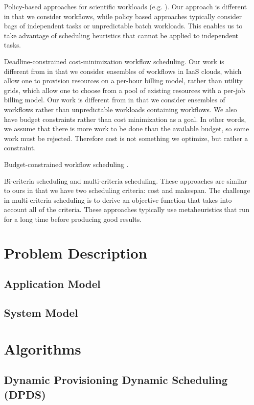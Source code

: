\documentclass{sig-alternate}
\begin{document}
Policy-based approaches for scientific workloads (e.g. \cite{Marshall2010, Kim2011}). Our approach is different in that we consider workflows, while policy based approaches typically consider bags of independent tasks or unpredictable batch workloads. This enables us to take advantage of scheduling heuristics that cannot be applied to independent tasks.

Deadline-constrained cost-minimization workflow scheduling. Our work is different from \cite{Yu2005, Abrishami2010} in that we consider ensembles of workflows in IaaS clouds, which allow one to provision resources on a per-hour billing model, rather than utility grids, which allow one to choose from a pool of existing resources with a per-job billing model. Our work is different from \cite{Mao2011} in that we consider ensembles of workflows rather than unpredictable workloads containing workflows. We also have budget constraints rather than cost minimization as a goal. In other words, we assume that there is more work to be done than the available budget, so some work must be rejected. Therefore cost is not something we optimize, but rather a constraint.

Budget-constrained workflow scheduling \cite{Sakellariou2007}.

Bi-criteria scheduling and multi-criteria scheduling. These approaches are similar to ours in that we have two scheduling criteria: cost and makespan. The challenge in multi-criteria scheduling is to derive an objective function that takes into account all of the criteria. These approaches typically use metaheuristics that run for a long time before producing good results.

\section{Problem Description}
\subsection{Application Model}
\subsection{System Model}


\section{Algorithms}
\subsection{Dynamic Provisioning Dynamic Scheduling (DPDS)}
\end{document}
